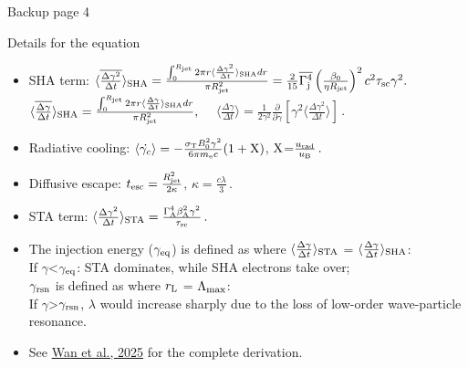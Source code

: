 \documentclass[10pt,aspectratio=169,mathserif]{beamer}
\begin{document}
\begin{frame}{Backup page 4}
    \begin{block}{Details for the equation}
        \begin{itemize}
            \item SHA term: $\langle \overline{\frac{\Delta \gamma^2}{\Delta t} }\rangle_{\rm SHA} = \frac{\int_{0}^{R_{\rm jet}}2\pi r\langle \frac{\Delta \gamma^2}{\Delta t} \rangle_{\rm SHA} dr}{\pi R_{\rm jet}^2} = \frac{2}{15}\overline{\Gamma_{\rm j}^4}\left(\frac{\beta_0}{\eta R_{\rm jet}}\right)^2c^2\tau_{\rm sc}\gamma^2.$\\
            $\langle \overline{\frac{\Delta \gamma}{\Delta t}} \rangle_{\rm SHA} = \frac{\int_{0}^{R_{\rm jet}}2\pi r\langle \frac{\Delta \gamma}{\Delta t} \rangle_{\rm SHA} dr}{\pi R_{\rm jet}^2},\quad$ $\langle \frac{\Delta \gamma}{\Delta t} \rangle = \frac{1}{2\gamma^2}\frac{\partial}{\partial \gamma}\left[ \gamma^2 \langle\frac{\Delta \gamma^2}{\Delta t}\rangle \right]\,.$

            \item Radiative cooling: $\langle \dot{\gamma_c} \rangle=-\frac{\sigma_{\rm T}B_0^2\gamma^2}{6 \pi m_{\rm e} c}(1+\rm X)$, $\rm X$=$\frac{u_{\rm rad}}{u_{\rm B}}\,.$

            \item Diffusive escape: $t_{\rm esc}=\frac{R_{\rm jet}^2}{2\kappa}$, $\kappa = \frac{c \lambda}{3}\,.$

            \item STA term: $\langle \frac{\Delta \gamma^2}{\Delta t} \rangle_{\rm STA}=\frac{\Gamma_{\rm A}^4\beta_{\rm A}^2 \gamma^2}{\tau_{\rm sc}}\,.$

            \item The injection energy ($\gamma_{\rm eq}$) is defined as where $\langle \frac{\Delta \gamma}{\Delta t} \rangle_{\rm STA}$ = $\langle \frac{\Delta \gamma}{\Delta t} \rangle_{\rm SHA}$:\\ If $\gamma$<$\gamma_{\rm eq}$: STA dominates, while SHA electrons take over;\\
            $\gamma_{\rm rsn}$ is defined as where $r_{\rm L}$ = $\Lambda_{\rm max}$:\\
            If $\gamma$>$\gamma_{\rm rsn}$, $\lambda$ would increase sharply due to the loss of low-order wave-particle resonance.

            \item See \href{https://arxiv.org/abs/2507.02763}{Wan et al., 2025} for the complete derivation.
              
        \end{itemize}
    \end{block}
\end{frame}
\end{document}
